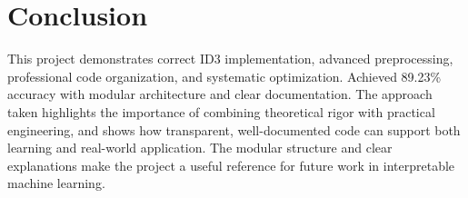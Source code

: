 \documentclass[conference]{IEEEtran}
\begin{document}
\section{Conclusion}
This project demonstrates correct ID3 implementation, advanced preprocessing, professional code organization, and systematic optimization. Achieved 89.23\% accuracy with modular architecture and clear documentation. The approach taken highlights the importance of combining theoretical rigor with practical engineering, and shows how transparent, well-documented code can support both learning and real-world application. The modular structure and clear explanations make the project a useful reference for future work in interpretable machine learning.
\end{document}
